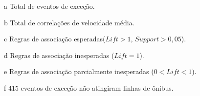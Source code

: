 \documentclass[
	12pt,				%
	oneside,			%
	a4paper,			%
	english,			%
	brazil				%
	]{abntex2ppgsi}
\begin{document}
{{\begin{apendicesenv}
\begin{table}[!htb]
\begin{threeparttable}
\begin{tablenotes}
            \item[a] Total de eventos de exceção.
            \item[b] Total de correlações de velocidade média.
            \item[c] Regras de associação esperadas($Lift > 1$, $Support > 0,05$).
            \item[d] Regras de associação inesperadas ($Lift = 1$).
            \item[e] Regras de associação parcialmente inesperadas ($0 < Lift < 1$).
            \item[f] 415 eventos de exceção não atingiram linhas de ônibus.
        \end{tablenotes}
\end{threeparttable}
\end{table}


\end{apendicesenv}}}
\end{document}
